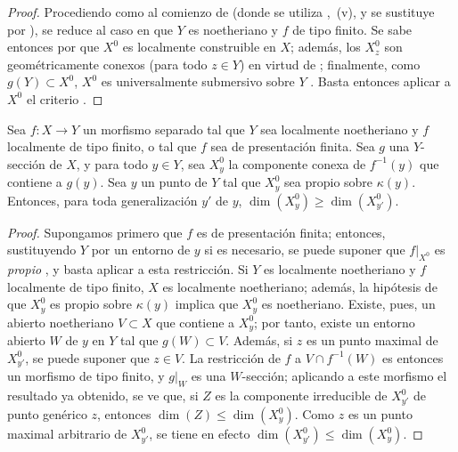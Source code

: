 \begin{proof}
Procediendo como al comienzo de  (donde se utiliza ,~(v), y se sustituye  por ), se reduce al caso en que $Y$ es noetheriano y $f$ de tipo finito. Se sabe entonces por  que $X^0$ es localmente construible en $X$; además, los $X_z^0$ son geométricamente conexos (para todo $z\in Y$) en virtud de ; finalmente, como $g(Y)\subset X^0$, $X^0$ es universalmente submersivo sobre $Y$ .
Basta entonces aplicar a $X^0$ el criterio .
\end{proof}

\begin{corollary}[15.6.9]
\label{IV.15.6.9}
Sea $f:X\to Y$ un morfismo separado tal que $Y$ sea localmente noetheriano y $f$ localmente de tipo finito, \textup{o} tal que $f$ sea de presentación finita.
Sea $g$ una $Y$-sección de $X$, y para todo $y\in Y$, sea $X_y^0$ la componente conexa de $f^{-1}(y)$ que contiene a $g(y)$.
Sea $y$ un punto de $Y$ tal que $X_y^0$ sea propio sobre $\kappa(y)$.
Entonces, para toda generalización $y'$ de $y$, $\dim(X_y^0)\geq\dim(X_{y'}^0)$.
\end{corollary}

\begin{proof}
Supongamos primero que $f$ es de presentación finita; entonces, sustituyendo $Y$ por un entorno de $y$ si es necesario, se puede suponer que $f|_{X^0}$ es \emph{propio} , y basta aplicar  a esta restricción.
Si $Y$ es localmente noetheriano y $f$ localmente de tipo finito, $X$ es localmente noetheriano; además, la hipótesis de que $X_y^0$ es propio sobre $\kappa(y)$ implica que $X_y^0$ es noetheriano. Existe, pues, un abierto noetheriano $V\subset X$ que contiene a $X_y^0$; por tanto, existe un entorno abierto $W$ de $y$ en $Y$ tal que $g(W)\subset V$.
Además, si $z$ es un punto maximal de $X_{y'}^0$, se puede suponer que $z\in V$. La restricción de $f$ a $V\cap f^{-1}(W)$ es entonces un morfismo de tipo finito, y $g|_W$ es una $W$-sección; aplicando a este morfismo el resultado ya obtenido, se ve que, si $Z$ es la componente irreducible de $X_{y'}^0$ de punto genérico $z$, entonces $\dim(Z)\leq\dim(X_y^0)$. Como $z$ es un punto maximal arbitrario de $X_{y'}^0$, se tiene en efecto $\dim(X_{y'}^0)\leq\dim(X_y^0)$.
\end{proof}


